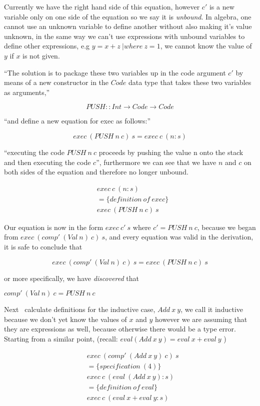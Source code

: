 \documentclass {article}
\begin{document}
Currently we have the right hand side of this equation,
however $c'$ is a new variable only on one side of the equation
so we say it is \emph{unbound}.
In algebra, one cannot use an unknown variable to define
another without also making it's value unknown,
in the same way we can't use expressions with
unbound variables to define other expressions,
e.g \(y = x + z\ | where\ z = 1\), we cannot
know the value of $y$ if $x$ is not given.

``The solution is to package these two
variables up in the code argument $c'$
by means of a new constructor in the $Code$ data type
that takes these two variables as arguments,''

	\[ PUSH :: Int \rightarrow Code \rightarrow Code \]

``and define a new equation for exec as follows:''

	\[ exec\ (PUSH\ n\ c)\ s = exec\ c\ (n :s) \]

``executing the code $PUSH\ n\ c$ 
proceeds by pushing the value n onto the stack and
then executing the code $c$'', furthermore
we can see that we have $n$ and $c$ on both
sides of the equation and therefore no longer unbound.

\begin{align*}
	&exec\ c\ (n:s) \\
	&= \{definition\ of\ exec\} \\
	&exec\ (PUSH\ n\ c)\ s
\end{align*}

Our equation is now in the form $exec\ c'\ s$
where $c' = PUSH\ n\ c$, 
because we began from 
\(exec\ (comp'\ (Val\ n)\ c)\ s \),
and every equation was valid in the derivation,
it is safe to conclude that 

	\[exec\ (comp'\ (Val\ n)\ c)\ s = exec\ (PUSH\ n\ c)\ s\]

or more specifically, we have \emph{discovered} that 
	
	\( comp'\ (Val\ n)\ c =  PUSH\ n\ c \)

Next \BH\ calculate definitions for the inductive case, 
$Add\ x\ y$,
we call it inductive because we don't yet know 
the values of $x$ and $y$ however we are assuming
that they are expressions as well,
because otherwise there would be a type error.
Starting from a similar point,
(recall: \( eval (Add\  x\  y) = eval\  x + eval\  y  \) )

\begin{align*}
	&exec\ (comp'\ (Add\ x\ y)\ c)\ s \\
	&= \{specification\ (4) \} \\
	&exec\ c\ (eval\ (Add\ x\ y) : s) \\
	&= \{definition\ of\ eval\} \\
	&exec\ c\ (eval\ x + eval\ y :s)
\end{align*}
\end{document}

